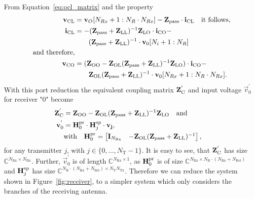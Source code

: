 From Equation~\eqref{eq:ocl_matrix} and the property
\begin{align}
\mathbf{v}_\text{CL} &= \mathbf{v}_O[N_{Rx}+1:N_R\cdot N_{Rx}]-\mathbf{Z}_{\text{pass}}\cdot\mathbf{i}_\text{CL}\quad\text{it follows,}\\
\mathbf{i}_\text{CL} &= -(\mathbf{Z}_{\text{pass}} + \mathbf{Z}_\text{LL})^{-1}\mathbf{Z}_\text{LO}\cdot\mathbf{i}_\text{CO} -\\\nonumber
&\qquad (\mathbf{Z}_{\text{pass}} + \mathbf{Z}_\text{LL})^{-1}\cdot\mathbf{v}_{0}[N_i+1:N_R]\\\nonumber\quad\text{and therefore,}&\\
\mathbf{v}_\text{CO} &= (\mathbf{Z}_\text{OO}-\mathbf{Z}_\text{OL}(\mathbf{Z}_{\text{pass}} + \mathbf{Z}_\text{LL})^{-1}\mathbf{Z}_\text{LO})\cdot\mathbf{i}_\text{CO} -\\\nonumber&\qquad \mathbf{Z}_\text{OL}(\mathbf{Z}_{\text{pass}} + \mathbf{Z}_\text{LL})^{-1}\cdot\mathbf{v}_0[N_{Rx}+1:N_R\cdot N_{Rx}].
\end{align}
With this port reduction the equivalent coupling matrix $\mathbf{Z}_\text{C}^{'}$ and input voltage $\vec{v}_0^{'}$ for receiver "0" become
\begin{align}
\label{eq:port_reduction}
\mathbf{Z}_\text{C}^{'}&= \mathbf{Z}_\text{OO} - \mathbf{Z}_\text{OL}(\mathbf{Z}_{\text{pass}} + \mathbf{Z}_\text{LL})^{-1}\mathbf{Z}_\text{LO}\quad\text{and}\\
\mathbf{v}_0^{'} &= \mathbf{H}_0^{\text{pr}} \cdot\mathbf{H}_{j}^{\text{sp}}\cdot \mathbf{v_j},\\\nonumber
&\text{with}\quad\mathbf{H}_0^{\text{pr}}=
\begin{bmatrix}
\mathbf{I}_{N_\text{Rx}} & -\mathbf{Z}_\text{OL}(\mathbf{Z}_{\text{pass}} + \mathbf{Z}_\text{LL})^{-1}
\end{bmatrix},
\end{align}
for any transmitter $j$, with $j\in\{0,...,N_\text{T}-1\}$.
It is easy to see, that $\mathbf{Z}_\text{C}^{'}$ has size $\mathbb{C}^{N_\text{Rx}\times N_\text{Rx}}$.
Further, $\vec{v}_0^{'}$ is of length $\mathbb{C}^{N_\text{Rx}\times 1}$, as 
$\mathbf{H}_0^{\text{pr}}$ is of size 
	$\mathbb{C}^{N_\text{Rx}\times N_\text{R}\cdot\left(N_\text{Rx}+N_\text{Rel}\right)}$ 
and $\mathbf{H}_j^{\text{sp}}$ has size 
	$\mathbb{C}^{N_\text{R}\cdot\left(N_\text{Rx}+N_\text{Rel}\right)\times N_\text{T}N_\text{Tx}}$.
Therefore we can reduce the system shown in Figure~\ref{fig:receiver}, to a simpler system which only considers the branches of the receiving antenna.





